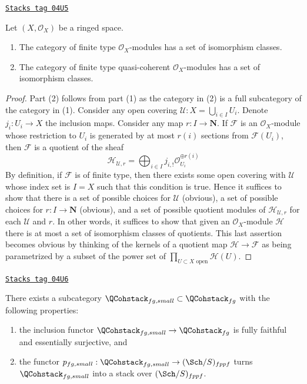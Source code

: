 \begin{lemma}
\label{examples-stacks-lemma-finite-type}
\href{https://stacks.math.columbia.edu/tag/04U5}{\texttt{Stacks tag 04U5}}

Let $(X, \mathcal{O}_X)$ be a ringed space.
\begin{enumerate}
\item The category of finite type $\mathcal{O}_X$-modules has a
set of isomorphism classes.
\item The category of finite type quasi-coherent
$\mathcal{O}_X$-modules has a set of isomorphism classes.
\end{enumerate}
\end{lemma}

\begin{proof}
Part (2) follows from part (1) as the category in (2) is a full subcategory
of the category in (1). Consider any open covering
$\mathcal{U} : X = \bigcup_{i \in I} U_i$. Denote $j_i : U_i \to X$
the inclusion maps. Consider any map $r : I \to \mathbf{N}$.
If $\mathcal{F}$ is an $\mathcal{O}_X$-module whose restriction to
$U_i$ is generated by at most $r(i)$ sections from $\mathcal{F}(U_i)$,
then $\mathcal{F}$ is a quotient of the sheaf
$$
\mathcal{H}_{\mathcal{U}, r} =
\bigoplus\nolimits_{i \in I} j_{i, !}\mathcal{O}_{U_i}^{\oplus r(i)}
$$
By definition, if $\mathcal{F}$ is of finite type, then there exists
some open covering with $\mathcal{U}$ whose index set is $I = X$
such that this condition is true. Hence it suffices to show that
there is a set of possible choices for $\mathcal{U}$ (obvious),
a set of possible choices for $r : I \to \mathbf{N}$ (obvious), and
a set of possible quotient modules of $\mathcal{H}_{\mathcal{U}, r}$
for each $\mathcal{U}$ and $r$. In other words, it suffices to show
that given an $\mathcal{O}_X$-module $\mathcal{H}$ there is at most
a set of isomorphism classes of quotients.
This last assertion becomes obvious
by thinking of the kernels of a quotient map
$\mathcal{H} \to \mathcal{F}$
as being parametrized by a subset of the power set of
$\prod_{U \subset X\text{ open}} \mathcal{H}(U)$.
\end{proof}

\begin{lemma}
\label{examples-stacks-lemma-stack-fg-quasi-coherent}
\href{https://stacks.math.columbia.edu/tag/04U6}{\texttt{Stacks tag 04U6}}

There exists a subcategory
$\QCohstack_{fg, small} \subset \QCohstack_{fg}$
with the following properties:
\begin{enumerate}
\item the inclusion functor
$\QCohstack_{fg, small} \to \QCohstack_{fg}$ is
fully faithful and essentially surjective, and
\item the functor
$p_{fg, small} : \QCohstack_{fg, small} \to (\Sch/S)_{fppf}$
turns $\QCohstack_{fg, small}$ into a stack over $(\Sch/S)_{fppf}$.
\end{enumerate}
\end{lemma}

